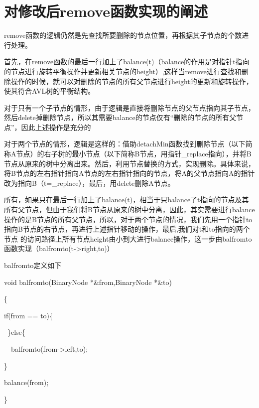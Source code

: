 \documentclass[UTF8]{ctexart}
\begin{document}
\pagestyle{fancy}
\fancyhead{}

\section{对修改后remove函数实现的阐述}
remove函数的逻辑仍然是先查找所要删除的节点位置，再根据其子节点的个数进行处理。

首先，在remove函数的最后一行加上了balance(t)（balance的作用是对指针t指向的节点进行旋转平衡操作并更新相关节点的height）,这样当remove进行查找和删除操作的时候，就可以对删除的节点的所有父节点进行height的更新和旋转操作，使其符合AVL树的平衡结构。

对于只有一个子节点的情形，由于逻辑是直接将删除节点的父节点指向其子节点，然后delete掉删除节点，所以其需要balance的节点仅有“删除的节点的所有父节点”，因此上述操作是充分的

对于两个节点的情形，逻辑是这样的：借助detachMin函数找到删除节点（以下简称A节点）的右子树的最小节点（以下简称B节点，用指针\_replace指向），并将B节点从原来的树中分离出来。然后，利用节点替换的方式，实现删除。具体来说，将B节点的左右指针指向A节点的左右指针指向的节点，将A的父节点指向A的指针改为指向B（t=\_replace），最后，用delete删除A节点。

所有，如果只在最后一行加上了balance(t)，相当于只balance了t指向的节点及其所有父节点，但由于我们将B节点从原来的树中分离，因此，其实需要进行balance操作的是B节点的所有父节点，所以，对于两个节点的情况，我们先用一个指针to指向B节点的右节点，再进行上述指针移动的操作，最后,我们对t和to指向的两个节点
的访问路径上所有节点height由小到大进行balance操作，这一步由balfromto函数实现（balfromto(t->right,to)）

balfromto定义如下

void balfromto(BinaryNode *\&from,BinaryNode *\&to)

    \{
    
    if(from == to)\{
            
        \ \}else\{
        
        \ \ balfromto(from->left,to);
            
        \}
        
        balance(from);

    \}
\\
\end{document}
